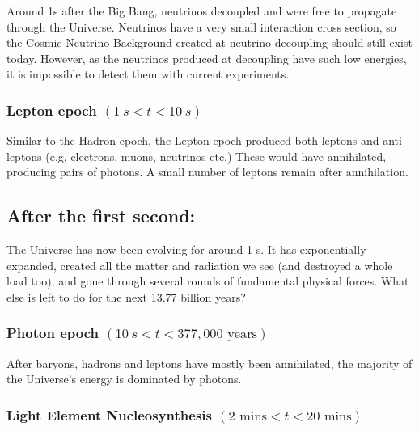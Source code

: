 \documentclass[]{book}
\begin{document}
Around 1s after the Big Bang, neutrinos decoupled and were free to
propagate through the Universe. Neutrinos have a very small interaction
cross section, so the Cosmic Neutrino Background created at neutrino
decoupling should still exist today. However, as the neutrinos produced
at decoupling have such low energies, it is impossible to detect them
with current experiments.

\subsubsection*{\texorpdfstring{Lepton epoch
\((1~s < t < 10~s)\)}{Lepton epoch (1\textasciitilde{}s \textless{} t \textless{} 10\textasciitilde{}s)}}\label{lepton-epoch-1s-t-10s}

Similar to the Hadron epoch, the Lepton epoch produced both leptons and
anti-leptons (e.g, electrons, muons, neutrinos etc.) These would have
annihilated, producing pairs of photons. A small number of leptons
remain after annihilation.

\subsection{After the first second:}\label{sec:after_1s}

The Universe has now been evolving for around 1 s. It has exponentially
expanded, created all the matter and radiation we see (and destroyed a
whole load too), and gone through several rounds of fundamental physical
forces. What else is left to do for the next 13.77 billion years?

\subsubsection*{\texorpdfstring{Photon epoch
\((10~s < t < 377,000\text{ years})\)}{Photon epoch (10\textasciitilde{}s \textless{} t \textless{} 377,000\textbackslash{}text\{ years\})}}\label{photon-epoch-10s-t-377000text-years}

After baryons, hadrons and leptons have mostly been annihilated, the
majority of the Universe's energy is dominated by photons.

\subsubsection*{\texorpdfstring{Light Element Nucleosynthesis
\((2 \text{ mins} < t < 20\text{ mins})\)}{Light Element Nucleosynthesis (2 \textbackslash{}text\{ mins\} \textless{} t \textless{} 20\textbackslash{}text\{ mins\})}}\label{light-element-nucleosynthesis-2-text-mins-t-20text-mins}
\end{document}
